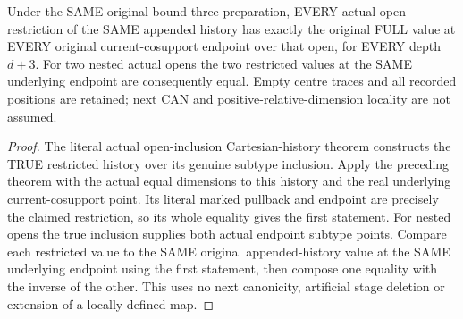 \begin{theorem}
\label{hir:original-prepared-bound-three-open-full-locality}
\leanok
Under the SAME original bound-three preparation, EVERY actual open
restriction of the SAME appended history has exactly the original
FULL value at EVERY original current-cosupport endpoint over that open,
for EVERY depth $d+3$. For two nested actual opens the two restricted
values at the SAME underlying endpoint are consequently equal. Empty
centre traces and all recorded positions are retained; next CAN and
positive-relative-dimension locality are not assumed.
\end{theorem}
\begin{proof}
The literal actual open-inclusion Cartesian-history theorem constructs
the TRUE restricted history over its genuine subtype inclusion. Apply
the preceding theorem with the actual equal dimensions to this history
and the real underlying current-cosupport point. Its literal marked
pullback and endpoint are precisely the claimed restriction, so its
whole equality gives the first statement. For nested opens the true
inclusion supplies both actual endpoint subtype points. Compare each
restricted value to the SAME original appended-history value at the
SAME underlying endpoint using the first statement, then compose one
equality with the inverse of the other. This uses no next canonicity,
artificial stage deletion or extension of a locally defined map.
\end{proof}
